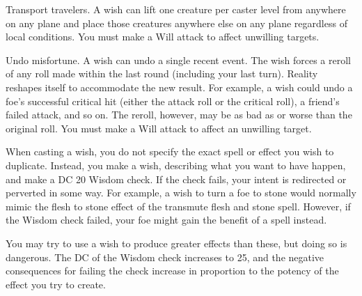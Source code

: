 \begin{spelleffect}
\begin{itemize*}
    \item Transport travelers. A wish can lift one creature per caster level from anywhere on any plane and place those creatures anywhere else on any plane regardless of local conditions. You must make a Will attack to affect unwilling targets.
    \item Undo misfortune. A wish can undo a single recent event. The wish forces a reroll of any roll made within the last round (including your last turn). Reality reshapes itself to accommodate the new result. For example, a wish could undo a foe's successful critical hit (either the attack roll or the critical roll), a friend's failed attack, and so on. The reroll, however, may be as bad as or worse than the original roll. You must make a Will attack to affect an unwilling target.
  \end{itemize*}
  \par When casting a wish, you do not specify the exact spell or effect you wish to duplicate. Instead, you make a wish, describing what you want to have happen, and make a DC 20 Wisdom check. If the check fails, your intent is redirected or perverted in some way. For example, a wish to turn a foe to stone would normally mimic the flesh to stone effect of the transmute flesh and stone spell. However, if the Wisdom check failed, your foe might gain the benefit of a  spell instead.
  \par You may try to use a wish to produce greater effects than these, but doing so is dangerous. The DC of the Wisdom check increases to 25, and the negative consequences for failing the check increase in proportion to the potency of the effect you try to create.
\end{spelleffect}

